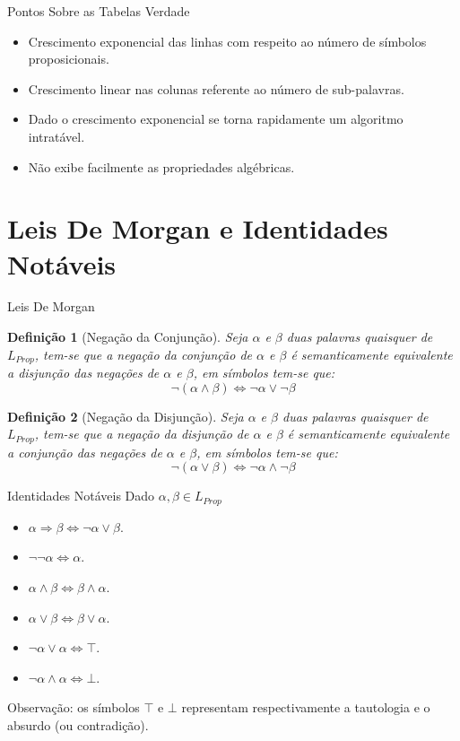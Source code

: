 \documentclass[aspectratio=169]{beamer}
\newtheorem{defi}{Definição}
\begin{document}
	\begin{frame}{Pontos Sobre as Tabelas Verdade}
		\begin{itemize}
			\item Crescimento exponencial das linhas com respeito ao número de símbolos proposicionais.
			\item Crescimento linear nas colunas referente ao número de sub-palavras.
			\item Dado o crescimento exponencial se torna rapidamente um algoritmo intratável.
			\item Não exibe facilmente as propriedades algébricas.
		\end{itemize}
	\end{frame}

	\section{Leis De Morgan e Identidades Notáveis}
	
	\begin{frame}{Leis De Morgan}
		\begin{defi}[Negação da Conjunção]
			Seja $\alpha$ e $\beta$ duas palavras quaisquer de $L_{Prop}$, tem-se que a negação da conjunção de $\alpha$ e $\beta$ é semanticamente equivalente a disjunção das negações de $\alpha$ e $\beta$, em símbolos tem-se que:
			$$\neg(\alpha \land \beta) \Leftrightarrow \neg \alpha \lor \neg \beta$$
		\end{defi}
		\begin{defi}[Negação da Disjunção]
			Seja $\alpha$ e $\beta$ duas palavras quaisquer de $L_{Prop}$, tem-se que a negação da disjunção de $\alpha$ e $\beta$ é semanticamente equivalente a conjunção das negações de $\alpha$ e $\beta$, em símbolos tem-se que:
			$$\neg(\alpha \lor \beta) \Leftrightarrow \neg \alpha \land \neg \beta$$
		\end{defi}
	\end{frame}

	\begin{frame}{Identidades Notáveis}
		Dado $\alpha, \beta \in L_{Prop}$
		\begin{itemize}
			\item $\alpha \Rightarrow \beta \Leftrightarrow \neg \alpha \lor \beta$.
			\item $\neg \neg \alpha \Leftrightarrow \alpha$.
			\item $\alpha \land \beta \Leftrightarrow \beta \land \alpha$.
			\item $\alpha \lor \beta \Leftrightarrow \beta \lor \alpha$.
			\item $\neg \alpha \lor \alpha \Leftrightarrow \top$.
			\item $\neg \alpha \land \alpha \Leftrightarrow \bot$.
		\end{itemize}
		{\color{red}Observação}: os símbolos $\top$ e $\bot$ representam respectivamente a tautologia e o absurdo (ou contradição).
	\end{frame}
\end{document}

